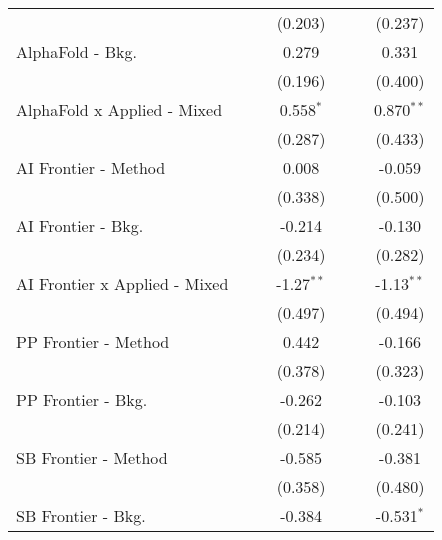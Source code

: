 \begin{tabular}{lcccccc}
                                  &         &         & (0.203)       &              &         & (0.237)\\   
   AlphaFold - Bkg.               &         &         & 0.279         &              &         & 0.331\\   
                                  &         &         & (0.196)       &              &         & (0.400)\\   
   AlphaFold x Applied - Mixed    &         &         & 0.558$^{*}$   &              &         & 0.870$^{**}$\\   
                                  &         &         & (0.287)       &              &         & (0.433)\\   
   AI Frontier - Method           &         &         & 0.008         &              &         & -0.059\\   
                                  &         &         & (0.338)       &              &         & (0.500)\\   
   AI Frontier - Bkg.             &         &         & -0.214        &              &         & -0.130\\   
                                  &         &         & (0.234)       &              &         & (0.282)\\   
   AI Frontier x Applied - Mixed  &         &         & -1.27$^{**}$  &              &         & -1.13$^{**}$\\   
                                  &         &         & (0.497)       &              &         & (0.494)\\   
   PP Frontier - Method           &         &         & 0.442         &              &         & -0.166\\   
                                  &         &         & (0.378)       &              &         & (0.323)\\   
   PP Frontier - Bkg.             &         &         & -0.262        &              &         & -0.103\\   
                                  &         &         & (0.214)       &              &         & (0.241)\\   
   SB Frontier - Method           &         &         & -0.585        &              &         & -0.381\\   
                                  &         &         & (0.358)       &              &         & (0.480)\\   
   SB Frontier - Bkg.             &         &         & -0.384        &              &         & -0.531$^{*}$\\   

\end{tabular}
